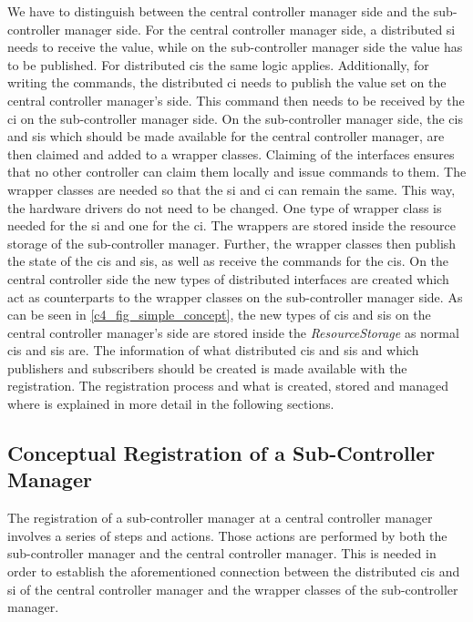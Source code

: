 We have to distinguish between the central controller manager side and the sub-controller manager side. For the central controller manager side, a distributed \gls{si} needs to receive the value, while on the sub-controller manager side the value has to be published. For distributed \glspl{ci} the same logic applies. Additionally, for writing the commands, the distributed \gls{ci} needs to publish the value set on the central controller manager's side. This command then needs to be received by the \gls{ci} on the sub-controller manager side. On the sub-controller manager side, the \glspl{ci} and \glspl{si} which should be made available for the central controller manager, are then claimed and added to a wrapper classes. Claiming of the interfaces ensures that no other controller can claim them locally and issue commands to them. The wrapper classes are needed so that the \gls{si} and \gls{ci} can remain the same. This way, the hardware drivers do not need to be changed. One type of wrapper class is needed for the \gls{si} and one for the \gls{ci}.  The wrappers are stored inside the resource storage of the sub-controller manager. Further, the wrapper classes then publish the state of the \glspl{ci} and \glspl{si}, as well as receive the commands for the \glspl{ci}. On the central controller side the new types of distributed interfaces are created which act as counterparts to the wrapper classes on the sub-controller manager side. As can be seen in \autoref{c4_fig_simple_concept}, the new types of \glspl{ci} and \glspl{si} on the central controller manager's side are stored inside the \textit{ResourceStorage} as normal \glspl{ci} and \glspl{si} are.\newline 
The information of what distributed \glspl{ci} and \glspl{si} and which publishers and subscribers should be created is made available with the registration. The registration process and what is created, stored and managed where is explained in more detail in the following sections.

\subsection{Conceptual Registration of a Sub-Controller Manager}\label{c4_sec_registraion_csi}
The registration of a sub-controller manager at a central controller manager involves a series of steps and actions. Those actions are performed by both the sub-controller manager and the central controller manager. This is needed in order to establish the aforementioned connection between the distributed \glspl{ci} and \gls{si} of the central controller manager and the wrapper classes of the sub-controller manager.

